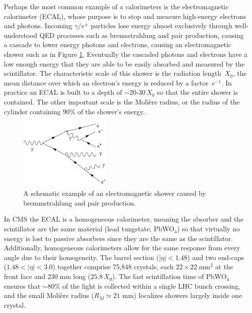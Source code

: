 Perhaps the most common example of a calorimeters is the electromagnetic calorimeter (ECAL), whose purpose is to stop and measure high-energy electrons and photons.  Incoming $\gamma/e^{\pm}$ particles lose energy almost exclusively through well-understood QED processes such as bremsstrahlung and pair production, causing a cascade to lower energy photons and electrons, causing an electromagnetic shower such as in Figure \ref{fig:electromagnetic-shower}. Eventually the cascaded photons and electrons have a low enough energy that they are able to be easily absorbed and measured by the scintillator.  The characteristic scale of this shower is the radiation length~$X_{0}$, the mean distance over which an electron's energy is reduced by a factor~$e^{-1}$.  In practice an ECAL is built to a depth of $\sim\!20$-30\,$X_{0}$ so that the entire shower is contained. The other important scale is the Molière radius, or the radius of the cylinder containing $90\%$ of the shower's energy.

\begin{figure}[htbp]
    \centering
    \includegraphics[width=0.4\textwidth]{figures/chapter3/electromagnetic-shower.png}
    \caption{A schematic example of an electromagnetic shower caused by bremmstrahlung and pair production.}
    \label{fig:electromagnetic-shower}
\end{figure}

In CMS the ECAL is a homogeneous calorimeter, meaning the absorber and the scintillator are the same material (lead tungstate, PbWO$_4$) so that virtually no energy is lost to passive absorbers since they are the same as the scintillator. Additionally, homogeneous calorimeters allow for the same response from every angle due to their homogeneity. The barrel section ($|\eta|<1.48$) and two end-caps ($1.48<|\eta|<3.0$) together comprise 75,848 crystals, each $22\times22\;\text{mm}^2$ at the front face and $230\;\text{mm}$ long ($25.8\,X_{0}$). The fast scintillation time of PbWO$_4$ ensures that $\sim80\%$ of the light is collected within a single LHC bunch crossing, and the small Molière radius ($R_M\simeq21$ mm) localizes showers largely inside one crystal.  

